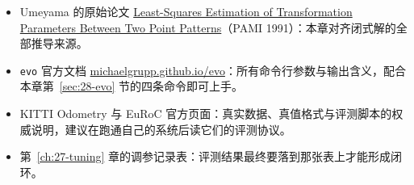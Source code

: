 \begin{reading}

\begin{itemize}
  \item Umeyama 的原始论文 \href{https://ieeexplore.ieee.org/document/88573}{Least-Squares Estimation of Transformation Parameters Between Two Point Patterns}（PAMI 1991）：本章对齐闭式解的全部推导来源。
  \item \lstinline{evo} 官方文档 \href{https://michaelgrupp.github.io/evo/}{michaelgrupp.github.io/evo}：所有命令行参数与输出含义，配合本章第~\ref{sec:28-evo} 节的四条命令即可上手。
  \item KITTI Odometry 与 EuRoC 官方页面：真实数据、真值格式与评测脚本的权威说明，建议在跑通自己的系统后读它们的评测协议。
  \item 第~\ref{ch:27-tuning} 章的调参记录表：评测结果最终要落到那张表上才能形成闭环。
\end{itemize}


\end{reading}
